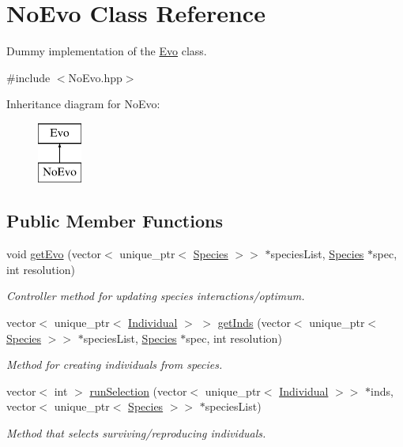 \hypertarget{classNoEvo}{}\section{No\+Evo Class Reference}
\label{classNoEvo}


Dummy implementation of the \hyperlink{classEvo}{Evo} class.  




{\ttfamily \#include $<$No\+Evo.\+hpp$>$}

Inheritance diagram for No\+Evo\+:\begin{figure}[H]
\begin{center}
\leavevmode
\includegraphics[height=2.000000cm]{classNoEvo}
\end{center}
\end{figure}
\subsection*{Public Member Functions}
\begin{DoxyCompactItemize}
\item 
void \hyperlink{classNoEvo_ad43cc958ff310c4767725c5f4a7e7ac4}{get\+Evo} (vector$<$ unique\+\_\+ptr$<$ \hyperlink{classSpecies}{Species} $>$$>$ $\ast$species\+List, \hyperlink{classSpecies}{Species} $\ast$spec, int resolution)
\begin{DoxyCompactList}\small\item\em Controller method for updating species interactions/optimum. \end{DoxyCompactList}\item 
vector$<$ unique\+\_\+ptr$<$ \hyperlink{classIndividual}{Individual} $>$ $>$ \hyperlink{classNoEvo_a9545e4f14c2038b8b7cab9362cb5fa9a}{get\+Inds} (vector$<$ unique\+\_\+ptr$<$ \hyperlink{classSpecies}{Species} $>$$>$ $\ast$species\+List, \hyperlink{classSpecies}{Species} $\ast$spec, int resolution)
\begin{DoxyCompactList}\small\item\em Method for creating individuals from species. \end{DoxyCompactList}\item 
vector$<$ int $>$ \hyperlink{classNoEvo_ae404207f48accfa7ea9f0022ed1af187}{run\+Selection} (vector$<$ unique\+\_\+ptr$<$ \hyperlink{classIndividual}{Individual} $>$$>$ $\ast$inds, vector$<$ unique\+\_\+ptr$<$ \hyperlink{classSpecies}{Species} $>$$>$ $\ast$species\+List)
\begin{DoxyCompactList}\small\item\em Method that selects surviving/reproducing individuals. \end{DoxyCompactList}\end{DoxyCompactItemize}
